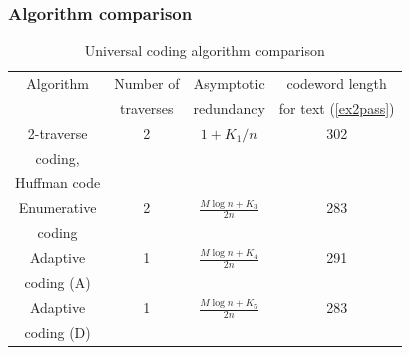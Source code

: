 \documentclass[14pt]{beamer}
\begin{document}
\begin{frame}
\frametitle{Algorithm comparison}
\begin{itemize}    
    
\footnotesize {
 
    \begin{table}[htbp]
    \caption{Universal coding algorithm comparison}
    \begin{center}
    \begin{tabular}
    {|c|c|c|c|}  \hline %
    Algorithm & Number of  & Asymptotic &   codeword length  \\ %
              & traverses  & redundancy &   for text (\ref{ex2pass})    \\%
    \hline %
    2-traverse  & 2& $1 + K_1 / n$& 302 \\%
    coding, &  &  &  \\ %
    Huffman code &  &  &  \\ \hline%
    Enumerative & 2& $\frac{M\log n + K_3 }{2n}$& 283 \\ %
    coding      &  &  &  \\\hline %
     Adaptive & 1& $\frac{M\log n + K_4 }{2n}$& 291 \\%
     coding (A) &  &  &   \\\hline %
    Adaptive  & 1& $\frac{M\log n + K_5 }{2n}$&283 \\%
    coding (D) &  &  &  \\\hline
    \end{tabular}
    \label{tab3_6} \end{center}
    \end{table}
}    
    
\end{itemize}
\end{frame}
\end{document}
